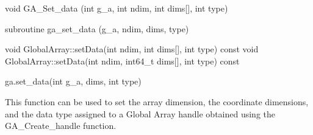 \documentclass[12pt]{article}
\begin{document}

\begin{capi}
\begin{ccode}
void GA_Set_data (int g_a, int ndim, int dims[], int type)
\end{ccode}
\begin{funcargs}
\end{funcargs}
\end{capi}

\begin{fapi}
\begin{fcode}
subroutine ga_set_data (g_a, ndim, dims, type)
\end{fcode}
\begin{funcargs}
\end{funcargs}
\end{fapi}

\begin{cxxapi}
\begin{cxxcode}
void GlobalArray::setData(int ndim, int dims[], int type) const
void GlobalArray::setData(int ndim, int64_t dims[], int type) const
\end{cxxcode}
\begin{funcargs}
\end{funcargs}
\end{cxxapi}

\begin{pyapi}
\begin{pycode}
ga.set_data(int g_a, dims, int type)
\end{pycode}
\begin{funcargs}
\end{funcargs}
\end{pyapi}

\gcoll

\begin{desc}

This function can be used to set the array dimension, the coordinate
dimensions, and the data type assigned to a Global Array handle obtained using
the GA_Create_handle function.

\end{desc}
\end{document}
